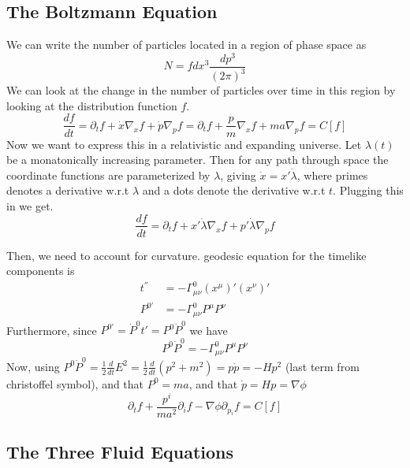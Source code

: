 \subsection{The Boltzmann Equation}
We can write the number of particles located in a region of phase space as
\begin{equation}
	N = f dx^3 \frac{dp^3}{(2\pi)^3}
\end{equation}
We can look at the change in the number of particles over time in this region by looking at the distribution function $f$.
\begin{equation}
	\frac{df}{dt} = \partial_t f + \dot{x}\nabla_xf + \dot{p}\nabla_pf = \partial_t f + \frac{p}{m}\nabla_xf + ma\nabla_pf = C[f]
\end{equation}
Now we want to express this in a relativistic and expanding universe. Let $\lambda(t)$ be a monatonically increasing parameter. Then for any path through space the coordinate functions are parameterized by $\lambda$, giving $\dot x = x'\dot\lambda$, where primes denotes a derivative w.r.t $\lambda$ and a dots denote the derivative w.r.t $t$. Plugging this in we get.
\begin{equation}
	\frac{df}{dt} = \partial_t f + x'\dot\lambda \nabla_xf + p' \dot\lambda \nabla_pf
\end{equation}

Then, we need to account for curvature. geodesic equation for the timelike components is
\begin{equation}
	\begin{split}
		t^{''} &= -\Gamma^{0}_{\mu\nu}(x^\mu)'(x^\nu)' \\
		P^{0'} &= -\Gamma^{0}_{\mu\nu} P^{\mu} P^{\nu}
	\end{split}
\end{equation}
Furthermore, since $P^{0'} = \dot{P}^{0} t' = P^{0}\dot{P}^{0}$ we have
\begin{equation}
	P^{0}\dot{P}^{0} = -\Gamma^{0}_{\mu\nu} P^{\mu} P^{\nu}
\end{equation}
Now, using $P^{0}\dot{P}^{0} = \frac{1}{2}\frac{d}{dt}E^2=\frac{1}{2}\frac{d}{dt}(p^2+m^2) = p\dot p = -Hp^2$ (last term from christoffel symbol), and that $P^0 = ma$, and that $\dot p = Hp = \nabla\phi$
\begin{equation}
	\partial_t f + \frac{p^i}{ma^2}\partial_i f - \nabla\phi \partial_{p_i}f = C[f]
\end{equation}
\subsection{The Three Fluid Equations}
